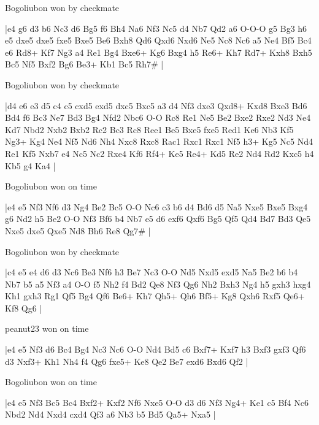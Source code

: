 \showboard

Bogoliubon won by checkmate

\makegametitle
|e4 g6 d3 b6 Nc3 d6 Bg5 f6 Bh4 Na6 Nf3 Nc5 d4 Nb7 Qd2 a6 O-O-O g5 Bg3 h6 e5 dxe5 dxe5 fxe5 Bxe5 Be6 Bxh8 Qd6 Qxd6 Nxd6 Ne5 Nc8 Nc6 a5 Ne4 Bf5 Bc4 e6 Rd8+ Kf7 Ng3 a4 Re1 Bg4 Bxe6+ Kg6 Bxg4 h5 Re6+ Kh7 Rd7+ Kxh8 Bxh5 Bc5 Nf5 Bxf2 Bg6 Be3+ Kb1 Bc5 Rh7\#  |

\showboard

Bogoliubon won by checkmate

\makegametitle
|d4 e6 e3 d5 c4 c5 cxd5 exd5 dxc5 Bxc5 a3 d4 Nf3 dxe3 Qxd8+ Kxd8 Bxe3 Bd6 Bd4 f6 Bc3 Ne7 Bd3 Bg4 Nfd2 Nbc6 O-O Rc8 Re1 Ne5 Be2 Bxe2 Rxe2 Nd3 Ne4 Kd7 Nbd2 Nxb2 Bxb2 Rc2 Bc3 Rc8 Ree1 Be5 Bxe5 fxe5 Red1 Ke6 Nb3 Kf5 Ng3+ Kg4 Ne4 Nf5 Nd6 Nh4 Nxc8 Rxc8 Rac1 Rxc1 Rxc1 Nf5 h3+ Kg5 Nc5 Nd4 Re1 Kf5 Nxb7 e4 Nc5 Nc2 Rxe4 Kf6 Rf4+ Ke5 Re4+ Kd5 Re2 Nd4 Rd2 Kxc5 h4 Kb5 g4 Ka4  |

\showboard

Bogoliubon won on time

\makegametitle
|e4 e5 Nf3 Nf6 d3 Ng4 Be2 Bc5 O-O Nc6 c3 b6 d4 Bd6 d5 Na5 Nxe5 Bxe5 Bxg4 g6 Nd2 h5 Be2 O-O Nf3 Bf6 b4 Nb7 e5 d6 exf6 Qxf6 Bg5 Qf5 Qd4 Bd7 Bd3 Qe5 Nxe5 dxe5 Qxe5 Nd8 Bh6 Re8 Qg7\#  |

\showboard

Bogoliubon won by checkmate

\makegametitle
|c4 e5 e4 d6 d3 Nc6 Be3 Nf6 h3 Be7 Nc3 O-O Nd5 Nxd5 exd5 Na5 Be2 b6 b4 Nb7 b5 a5 Nf3 a4 O-O f5 Nh2 f4 Bd2 Qe8 Nf3 Qg6 Nh2 Bxh3 Ng4 h5 gxh3 hxg4 Kh1 gxh3 Rg1 Qf5 Bg4 Qf6 Be6+ Kh7 Qh5+ Qh6 Bf5+ Kg8 Qxh6 Rxf5 Qe6+ Kf8 Qg6  |

\showboard

peanut23 won on time

\makegametitle
|e4 e5 Nf3 d6 Bc4 Bg4 Nc3 Nc6 O-O Nd4 Bd5 c6 Bxf7+ Kxf7 h3 Bxf3 gxf3 Qf6 d3 Nxf3+ Kh1 Nh4 f4 Qg6 fxe5+ Ke8 Qe2 Be7 exd6 Bxd6 Qf2  |

\showboard

Bogoliubon won on time

\makegametitle
|e4 e5 Nf3 Bc5 Bc4 Bxf2+ Kxf2 Nf6 Nxe5 O-O d3 d6 Nf3 Ng4+ Ke1 c5 Bf4 Nc6 Nbd2 Nd4 Nxd4 cxd4 Qf3 a6 Nb3 b5 Bd5 Qa5+ Nxa5  |

